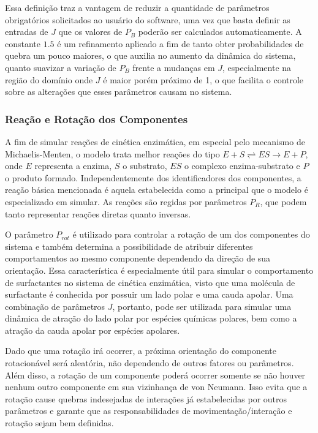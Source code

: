 \documentclass[12pt,oneside]{report}
\begin{document}
Essa definição traz a vantagem de reduzir a quantidade de parâmetros obrigatórios solicitados ao usuário do software, uma vez que basta definir as entradas de $J$ que os valores de $P_B$ poderão ser calculados automaticamente. A constante $1.5$ é um refinamento aplicado a fim de tanto obter probabilidades de quebra um pouco maiores, o que auxilia no aumento da dinâmica do sistema, quanto suavizar a variação de $P_B$ frente a mudanças em $J$, especialmente na região do domínio onde $J$ é maior porém próximo de 1, o que facilita o controle sobre as alterações que esses parâmetros causam no sistema.

\subsubsection{Reação e Rotação dos Componentes}

A fim de simular reações de cinética enzimática, em especial pelo mecanismo de Michaelis-Menten, o modelo trata melhor reações do tipo $E + S \rightleftharpoons ES \rightarrow E + P$, onde $E$ representa a enzima, $S$ o substrato, $ES$ o complexo enzima-substrato e $P$ o produto formado. Independentemente dos identificadores dos componentes, a reação básica mencionada é aquela estabelecida como a principal que o modelo é especializado em simular. As reações são regidas por parâmetros $P_R$, que podem tanto representar reações diretas quanto inversas.

O parâmetro $P_{rot}$ é utilizado para controlar a rotação de um dos componentes do sistema e também determina a possibilidade de atribuir diferentes comportamentos ao mesmo componente dependendo da direção de sua orientação. Essa característica é especialmente útil para simular o comportamento de surfactantes no sistema de cinética enzimática, visto que uma molécula de surfactante é conhecida por possuir um lado polar e uma cauda apolar. Uma combinação de parâmetros $J$, portanto, pode ser utilizada para simular uma dinâmica de atração do lado polar por espécies químicas polares, bem como a atração da cauda apolar por espécies apolares.

Dado que uma rotação irá ocorrer, a próxima orientação do componente rotacionável será aleatória, não dependendo de outros fatores ou parâmetros. Além disso, a rotação de um componente poderá ocorrer somente se não houver nenhum outro componente em sua vizinhança de von Neumann. Isso evita que a rotação cause quebras indesejadas de interações já estabelecidas por outros parâmetros e garante que as responsabilidades de movimentação/interação e rotação sejam bem definidas.
\end{document}
